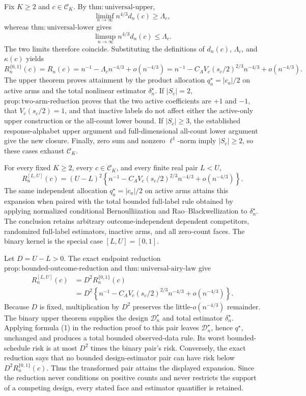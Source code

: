 Fix \(K\ge2\) and \(c\in\mathcal C_K\).  By \(\mathrm{thm:universal\text{-}upper}\),
\[
\liminf_{n\to\infty}n^{4/3}d_n(c)\ge\Lambda_c,
\]
whereas \(\mathrm{thm:universal\text{-}lower}\) gives
\[
\limsup_{n\to\infty}n^{4/3}d_n(c)\le\Lambda_c.
\]
The two limits therefore coincide.  Substituting the definitions of \(d_n(c)\), \(\Lambda_c\), and \(\kappa(c)\) yields
\[
R_n^{\{0,1\}}(c)=R_n(c)
=n^{-1}-\Lambda_cn^{-4/3}+o(n^{-4/3})
=n^{-1}-C_AV_c(s_c/2)^{2/3}n^{-4/3}+o(n^{-4/3}).
\]
The upper theorem proves attainment by the product allocation \(q_a^\star=|c_a|/2\) on active arms and the total nonlinear estimator \(\delta_n^\star\).  If \(|S_c|=2\), \(\mathrm{prop:two\text{-}arm\text{-}reduction}\) proves that the two active coefficients are \(+1\) and \(-1\), that \(V_c(s_c/2)=1\), and that inactive labels do not affect either the active-only upper construction or the all-count lower bound.  If \(|S_c|\ge3\), the established response-alphabet upper argument and full-dimensional all-count lower argument give the new closure.  Finally, zero sum and nonzero \(\ell^1\)-norm imply \(|S_c|\ge2\), so these cases exhaust \(\mathcal C_K\).

For every fixed \(K\ge2\), every \(c\in\mathcal C_K\), and every finite real pair \(L<U\),
\[
R_n^{[L,U]}(c)
=(U-L)^2\left\{
n^{-1}-C_AV_c(s_c/2)^{2/3}n^{-4/3}+o(n^{-4/3})
\right\}.
\]
The same independent allocation \(q_a^\star=|c_a|/2\) on active arms attains this expansion when paired with the total bounded full-label rule obtained by applying normalized conditional Bernoulliization and Rao--Blackwellization to \(\delta_n^\star\).  The conclusion retains arbitrary outcome-independent dependent competitors, randomized full-label estimators, inactive arms, and all zero-count faces.  The binary kernel is the special case \([L,U]=[0,1]\).

Let \(D=U-L>0\).  The exact endpoint reduction \(\mathrm{prop:bounded\text{-}outcome\text{-}reduction}\) and \(\mathrm{thm:universal\text{-}airy\text{-}law}\) give
\[
\begin{aligned}
R_n^{[L,U]}(c)
&=D^2R_n^{\{0,1\}}(c)\\
&=D^2\left\{
n^{-1}-C_AV_c(s_c/2)^{2/3}n^{-4/3}+o(n^{-4/3})
\right\}.
\end{aligned}
\]
Because \(D\) is fixed, multiplication by \(D^2\) preserves the little-\(o(n^{-4/3})\) remainder.  The binary upper theorem supplies the design \(\mathcal D_n^\star\) and total estimator \(\delta_n^\star\).  Applying formula (1) in the reduction proof to this pair leaves \(\mathcal D_n^\star\), hence \(q^\star\), unchanged and produces a total bounded observed-data rule.  Its worst bounded-schedule risk is at most \(D^2\) times the binary pair's risk.  Conversely, the exact reduction says that no bounded design-estimator pair can have risk below \(D^2R_n^{\{0,1\}}(c)\).  Thus the transformed pair attains the displayed expansion.  Since the reduction never conditions on positive counts and never restricts the support of a competing design, every stated face and estimator quantifier is retained.

